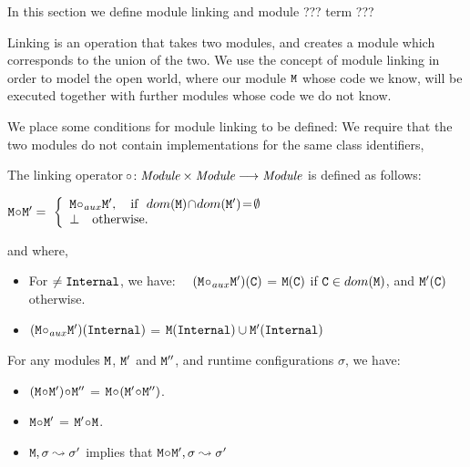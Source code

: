  In this section we define  module linking and module ??? term ???
 
 Linking is an operation that takes two modules, and creates a module which corresponds  to the union of the two. We use the concept of module linking in order to model the open world, where our module ${\mbox{\tt{M}}}$ whose code we know, will be executed together with further modules whose code we do not know. 

We place some conditions for module linking to be defined: We require that the two modules do not contain implementations for the same class identifiers,  

\begin{definition}

The linking operator $\!\circ\!: {\mbox{\tt{{\it Module}}}} \times  {\mbox{\tt{{\it Module}}}} \longrightarrow {\mbox{\tt{{\it Module}}}}$ is defined as follows:

$
\M \link \M{'}  =\ \left\{
\begin{array}{l}
                        \M \link_{aux} \M{'},\ \ \   \hbox{if}\  \ dom(\M)\!\cap\!dom(\M')\!=\!\emptyset\\
\bot  \ \ \ \mbox{otherwise.}
\end{array}
                    \right.$
                    
and where,                  
\begin{itemize}
     \item 
   For $\neq{\mbox{\tt{Internal}}}$, we have: \ \
   $({\mbox{\tt{M}}} \!\circ\!_{aux} {\mbox{\tt{M}}}')({\mbox{\tt{C}}})$ = ${\mbox{\tt{M}}}({\mbox{\tt{C}}})$  if  ${\mbox{\tt{C}}}\in dom({\mbox{\tt{M}}})$, and  ${\mbox{\tt{M}}}'({\mbox{\tt{C}}})$ otherwise.
    \item  
   $({\mbox{\tt{M}}} \!\circ\!_{aux} {\mbox{\tt{M}}}')({\mbox{\tt{Internal}}})$ = $ {\mbox{\tt{M}}}({\mbox{\tt{Internal}}}) \cup  {\mbox{\tt{M}}}'({\mbox{\tt{Internal}}})$
 \end{itemize}
\end{definition}

 
 \begin{lemma}
 For any modules ${\mbox{\tt{M}}}$,   ${\mbox{\tt{M}}}'$ and ${\mbox{\tt{M}}}''$, and runtime configurations $\sigma$, we have$:$
 \label{lemma:linking:properties}
 
 \begin{itemize}
     \item 
     $({\mbox{\tt{M}}} \!\circ\! {\mbox{\tt{M}}}')\!\circ\! {\mbox{\tt{M}}}''$ = ${\mbox{\tt{M}}} \!\circ\! ({\mbox{\tt{M}}}' \!\circ\! {\mbox{\tt{M}}}'')$.
    \item  
      ${\mbox{\tt{M}}} \!\circ\! {\mbox{\tt{M}}}'$  = ${\mbox{\tt{M}}}' \!\circ\!{\mbox{\tt{M}}}$.
      \item
      ${\mbox{\tt{M}}}, \sigma \leadsto \sigma'$  implies that  ${\mbox{\tt{M}}}\!\circ\! {\mbox{\tt{M}}}', \sigma \leadsto \sigma'$
   \end{itemize}
 
 \end{lemma}
 
